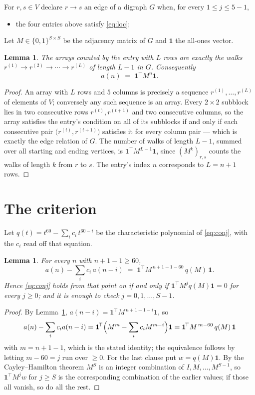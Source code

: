 \documentclass[11pt,a4paper]{article}
\theoremstyle{plain}
\newtheorem{lemma}[theorem]{Lemma}
\theoremstyle{definition}
\begin{document}
For $r,s\in V$ declare $r\to s$ an edge of a digraph $G$ when, for every
$1\le j\le 5-1$,
\begin{itemize}
\item the four entries above satisfy \eqref{eq:loc};

\end{itemize}
Let $M\in\{0,1\}^{S\times S}$ be the adjacency matrix of $G$ and $\mathbf{1}$ the
all-ones vector.

\begin{lemma}\label{lem:walk}
The arrays counted by the entry with $L$ rows are exactly the walks
$r^{(1)}\to r^{(2)}\to\cdots\to r^{(L)}$ of length $L-1$ in $G$. Consequently
\[
a(n)\;=\;\mathbf{1}^{\!\top}M^{n}\mathbf{1} .
\]
\end{lemma}

\begin{proof}
An array with $L$ rows and $5$ columns is precisely a sequence
$r^{(1)},\dots,r^{(L)}$ of elements of $V$; conversely any such sequence is an array.
Every $2\times2$ subblock lies in two consecutive rows $r^{(t)},r^{(t+1)}$ and two
consecutive columns, so the array satisfies the entry's condition on all of its subblocks
if and only if each consecutive pair $\bigl(r^{(t)},r^{(t+1)}\bigr)$ satisfies it for
every column pair --- which is exactly the edge relation of $G$. The number of walks of
length $L-1$, summed over all starting and ending vertices, is
$\mathbf{1}^{\!\top}M^{L-1}\mathbf{1}$, since $(M^{k})_{r,s}$ counts the walks of
length $k$ from $r$ to $s$. The entry's index $n$ corresponds to $L=n+1$ rows.
\end{proof}

\section{The criterion}

Let $q(t)=t^{60}-\sum_i c_i\,t^{60-i}$ be the characteristic polynomial of
\eqref{eq:conj}, with the $c_i$ read off that equation.

\begin{lemma}\label{lem:crit}
For every $n$ with $n+1-1\ge60$,
\[
a(n)-\sum_i c_i\,a(n-i)\;=\;\mathbf{1}^{\!\top}M^{\,n+1-1-60}\,q(M)\,\mathbf{1} .
\]
Hence \eqref{eq:conj} holds from that point on if and only if
$\mathbf{1}^{\!\top}M^{j}q(M)\mathbf{1}=0$ for every $j\ge0$; and it is enough to check
$j=0,1,\dots,S-1$.
\end{lemma}

\begin{proof}
By Lemma~\ref{lem:walk}, $a(n-i)=\mathbf{1}^{\!\top}M^{\,n+1-1-i}\mathbf{1}$, so
\[
a(n)-\sum_i c_i a(n-i)
=\mathbf{1}^{\!\top}\Bigl(M^{m}-\sum_i c_i M^{m-i}\Bigr)\mathbf{1}
=\mathbf{1}^{\!\top}M^{\,m-60}\,q(M)\,\mathbf{1}
\]
with $m=n+1-1$, which is the stated identity; the equivalence follows by letting
$m-60=j$ run over $\ge0$. For the last clause put $w=q(M)\mathbf{1}$. By the
Cayley--Hamilton theorem $M^{S}$ is an integer combination of $I,M,\dots,M^{S-1}$, so
$\mathbf{1}^{\!\top}M^{j}w$ for $j\ge S$ is the corresponding combination of the earlier
values; if those all vanish, so do all the rest.
\end{proof}
\end{document}
